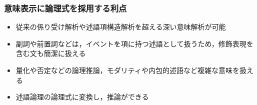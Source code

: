 \documentclass[dvipdfmx]{beamer}
\newcommand{\LF}[1]{\ensuremath{\texttt{\bf #1}}}
\begin{document}


\begin{frame}
\frametitle{意味表示に論理式を採用する利点}

\begin{itemize}
 \item 従来の係り受け解析や述語項構造解析を超える深い意味解析が可能%
 \item 副詞や前置詞などは，イベントを項に持つ述語として扱うため，修飾表現を含む文も簡潔に扱える %
 \item 量化や否定などの論理推論，モダリティや内包的述語など複雑な意味を扱える
 \item 述語論理の論理式に変換し，推論ができる
\end{itemize}
 \end{frame}
\end{document}
